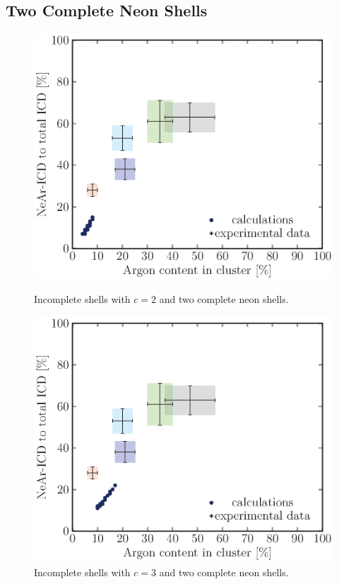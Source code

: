 \subsection{Two Complete Neon Shells}
\begin{figure}[!H]
\begin{minipage}{0.48\textwidth}
    \centering
    \includegraphics[scale=0.5]{pics/incompl02_02.ps}
    \caption{Incomplete shells with $c=2$ and two complete neon shells.}
    \label{incompl01_02_2neon}
\end{minipage}
\hfill
\begin{minipage}{0.48\textwidth}
    \centering
    \includegraphics[scale=0.5]{pics/incompl02_03.ps}
    \caption{Incomplete shells with $c=3$ and two complete neon shells.}
    \label{incompl01_03_2neon}
\end{minipage}
\end{figure}

